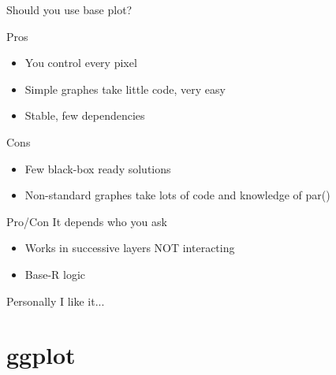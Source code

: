 \documentclass[10pt]{beamer}\usepackage[]{graphicx}\usepackage[]{color}
\begin{document}
\begin{frame}{Should you use base plot?}

  \begin{exampleblock}{Pros}
    \begin{itemize}
    \item You control every pixel
    \item Simple graphes take little code, very easy
    \item Stable, few dependencies
    \end{itemize}
  \end{exampleblock}

\pause

  \begin{alertblock}{Cons}
    \begin{itemize}
    \item Few black-box ready solutions
    \item Non-standard graphes take lots of code and knowledge of par()
    \end{itemize}
  \end{alertblock}

\pause

\begin{block}{Pro/Con It depends who you ask}
    \begin{itemize}
      \item Works in successive layers NOT interacting
      \item Base-R logic
    \end{itemize}
\end{block}

\end{frame}

\begin{frame}{Personally I like it...}
\centering
{}
\end{frame}


\section{ggplot}
\end{document}
